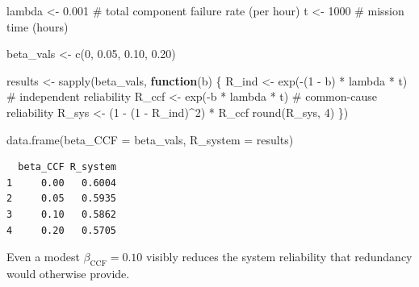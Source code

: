 \documentclass[
  letterpaper,
  DIV=11,
  numbers=noendperiod]{scrreprt}
\newenvironment{Shaded}{\begin{snugshade}}{\end{snugshade}}
\newcommand{\AttributeTok}[1]{\textcolor[rgb]{0.40,0.45,0.13}{#1}}
\newcommand{\CommentTok}[1]{\textcolor[rgb]{0.37,0.37,0.37}{#1}}
\newcommand{\ControlFlowTok}[1]{\textcolor[rgb]{0.00,0.23,0.31}{\textbf{#1}}}
\newcommand{\DecValTok}[1]{\textcolor[rgb]{0.68,0.00,0.00}{#1}}
\newcommand{\FloatTok}[1]{\textcolor[rgb]{0.68,0.00,0.00}{#1}}
\newcommand{\FunctionTok}[1]{\textcolor[rgb]{0.28,0.35,0.67}{#1}}
\newcommand{\NormalTok}[1]{\textcolor[rgb]{0.00,0.23,0.31}{#1}}
\newcommand{\OtherTok}[1]{\textcolor[rgb]{0.00,0.23,0.31}{#1}}
\newcommand{\SpecialCharTok}[1]{\textcolor[rgb]{0.37,0.37,0.37}{#1}}
\begin{document}
\begin{Shaded}
\begin{Highlighting}[]
\NormalTok{lambda }\OtherTok{\textless{}{-}} \FloatTok{0.001}   \CommentTok{\# total component failure rate (per hour)}
\NormalTok{t      }\OtherTok{\textless{}{-}} \DecValTok{1000}    \CommentTok{\# mission time (hours)}

\NormalTok{beta\_vals }\OtherTok{\textless{}{-}} \FunctionTok{c}\NormalTok{(}\DecValTok{0}\NormalTok{, }\FloatTok{0.05}\NormalTok{, }\FloatTok{0.10}\NormalTok{, }\FloatTok{0.20}\NormalTok{)}

\NormalTok{results }\OtherTok{\textless{}{-}} \FunctionTok{sapply}\NormalTok{(beta\_vals, }\ControlFlowTok{function}\NormalTok{(b) \{}
\NormalTok{  R\_ind }\OtherTok{\textless{}{-}} \FunctionTok{exp}\NormalTok{(}\SpecialCharTok{{-}}\NormalTok{(}\DecValTok{1} \SpecialCharTok{{-}}\NormalTok{ b) }\SpecialCharTok{*}\NormalTok{ lambda }\SpecialCharTok{*}\NormalTok{ t)   }\CommentTok{\# independent reliability}
\NormalTok{  R\_ccf }\OtherTok{\textless{}{-}} \FunctionTok{exp}\NormalTok{(}\SpecialCharTok{{-}}\NormalTok{b }\SpecialCharTok{*}\NormalTok{ lambda }\SpecialCharTok{*}\NormalTok{ t)         }\CommentTok{\# common{-}cause reliability}
\NormalTok{  R\_sys }\OtherTok{\textless{}{-}}\NormalTok{ (}\DecValTok{1} \SpecialCharTok{{-}}\NormalTok{ (}\DecValTok{1} \SpecialCharTok{{-}}\NormalTok{ R\_ind)}\SpecialCharTok{\^{}}\DecValTok{2}\NormalTok{) }\SpecialCharTok{*}\NormalTok{ R\_ccf}
  \FunctionTok{round}\NormalTok{(R\_sys, }\DecValTok{4}\NormalTok{)}
\NormalTok{\})}

\FunctionTok{data.frame}\NormalTok{(}\AttributeTok{beta\_CCF =}\NormalTok{ beta\_vals, }\AttributeTok{R\_system =}\NormalTok{ results)}
\end{Highlighting}
\end{Shaded}

\begin{verbatim}
  beta_CCF R_system
1     0.00   0.6004
2     0.05   0.5935
3     0.10   0.5862
4     0.20   0.5705
\end{verbatim}

Even a modest \(\beta_{\text{CCF}} = 0.10\) visibly reduces the system
reliability that redundancy would otherwise provide.
\end{document}
